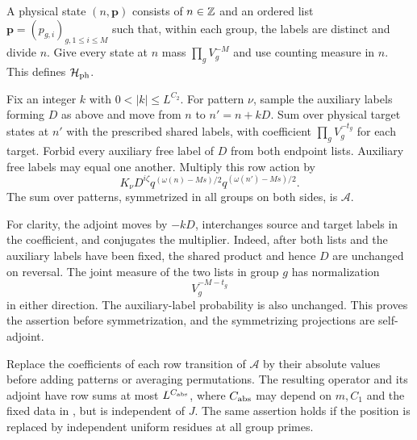 \begin{definition}\label{def:physical-operator}
A physical state $(n,\mathbf p)$ consists of $n\in\mathbb Z$ and an
ordered list $\mathbf p=(p_{g,i})_{g,1\le i\le M}$ such that,
within each group, the labels are distinct and divide $n$.
Give every state at $n$ mass $\prod_gV_g^{-M}$ and use counting
measure in $n$.  This defines $\mathcal H_{\rm ph}$.

Fix an integer $k$ with $0<|k|\le L^{C_2}$.  For pattern $\nu$,
sample the auxiliary labels forming $D$ as above and move from
$n$ to $n'=n+kD$.  Sum over physical target states at $n'$ with
the prescribed shared labels, with coefficient
$\prod_g V_g^{-t_g}$ for each target.  Forbid every auxiliary free
label of $D$ from both endpoint lists.  Auxiliary free labels may
equal one another.  Multiply this row action by
\begin{equation}\label{eq:physical-multiplier}
 K_\nu D^{i\zeta}
 q^{(\omega(n)-Ms)/2}q^{(\omega(n')-Ms)/2}.
\end{equation}
The sum over patterns, symmetrized in all groups on both sides,
is $\mathcal A$.
\end{definition}

For clarity, the adjoint moves by $-kD$, interchanges source and
target labels in the coefficient, and conjugates the multiplier.
Indeed, after both lists and the auxiliary labels have been fixed,
the shared product and hence $D$ are unchanged on reversal.  The
joint measure of the two lists in group $g$ has normalization
\begin{equation}\label{eq:physical-joint-measure}
 V_g^{-M-t_g}
\end{equation}
in either direction.  The auxiliary-label probability is also
unchanged.  This proves the assertion before symmetrization, and
the symmetrizing projections are self-adjoint.

\begin{lemma}\label{lem:physical-schur}
Replace the coefficients of each row transition of $\mathcal A$
by their absolute values before adding patterns or averaging
permutations.  The resulting operator and its adjoint have row
sums at most $L^{C_{\rm abs}}$, where $C_{\rm abs}$ may depend on
$m,C_1$ and the fixed data in , but is
independent of $J$.  The same assertion holds if the position is
replaced by independent uniform residues at all group primes.
\end{lemma}

